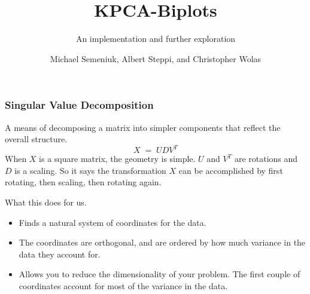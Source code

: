 \documentclass{beamer}
\title
                 {
                   KPCA-Biplots
                 }
\subtitle{An implementation and further exploration}
\author
                     {
                       Michael Semeniuk, Albert Steppi, and \linebreak
                       Christopher Wolas
                     }
\date
                         {
                           \begin{block}{}
                             \begin{itemize}
                             \item[~]
                               {
                                 \underline{Mining Gene Expression Profiles:
                                   An Integrated} \linebreak
                                 \underline{Implementation of Kernel Principal
                                   Component} \linebreak
                                 \underline{Analysis and Singular Value
                                   Decomposition}
                                 \begin{itemize}
                                   \item[~] Reverter et al, Genomics Proteomics
                                     Bioinformatics (2010)
                                 \end{itemize}
                               }
                             \end{itemize}
                           \end{block}
                         }
\begin{document}
                         \begin{frame}
                           \titlepage
                         \end{frame}

                         \begin{frame}[t]
                           \frametitle{Singular Value Decomposition}
                           A means of decomposing a matrix into simpler 
                           components that reflect the overall structure.
                           \begin{equation}                             
                             X\;=\;UDV^{T}                             
                           \end{equation}
                           When $X$ is a square matrix, the geometry is simple.
                           $U$ and $V^{T}$ are rotations and $D$
                           is a scaling. So it says the transformation $X$ can
                           be accomplished by first rotating, then scaling, then
                           rotating again.

                           \begin{block}{What this does for us.}
                             \begin{itemize}
                               \item Finds a natural system of coordinates for
                                 the data.
                               \item The coordinates are orthogonal, and are 
                                 ordered by how much variance in the data they
                                 account for.
                               \item Allows you to reduce the dimensionality of
                                 your problem. The first couple of coordinates
                                 account for most of the variance in the data.
                             \end{itemize}
                           \end{block}                           
                         \end{frame}
                         
\end{document}
